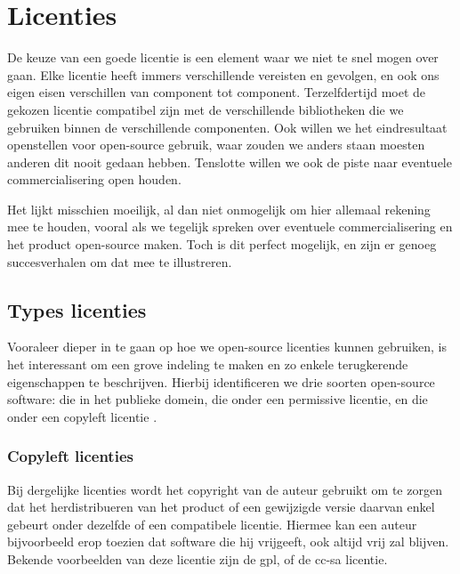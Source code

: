 \chapter{Licenties}
\label{ontwerp:licenties}

De keuze van een goede licentie is een element waar we niet te snel mogen over gaan. Elke licentie heeft immers verschillende vereisten en gevolgen, en ook ons eigen eisen verschillen van component tot component. Terzelfdertijd moet de gekozen licentie compatibel zijn met de verschillende bibliotheken die we gebruiken binnen de verschillende componenten. Ook willen we het eindresultaat openstellen voor open-source gebruik, waar zouden we anders staan moesten anderen dit nooit gedaan hebben. Tenslotte willen we ook de piste naar eventuele commercialisering open houden.

Het lijkt misschien moeilijk, al dan niet onmogelijk om hier allemaal rekening mee te houden, vooral als we tegelijk spreken over eventuele commercialisering en het product open-source maken. Toch is dit perfect mogelijk, en zijn er genoeg succesverhalen om dat mee te illustreren.

\section{Types licenties}
\label{ontwerp:licenties:type}

Vooraleer dieper in te gaan op hoe we open-source licenties kunnen gebruiken, is het interessant om een grove indeling te maken en zo enkele terugkerende eigenschappen te beschrijven. Hierbij identificeren we drie soorten open-source software: die in het publieke domein, die onder een permissive licentie, en die onder een copyleft licentie \citep{fsf:categories}.

\subsection{Copyleft licenties}
\label{ontwerp:licenties:type:copyleft}

Bij dergelijke licenties wordt het copyright van de auteur gebruikt om te zorgen dat het herdistribueren van het product of een gewijzigde versie daarvan enkel gebeurt onder dezelfde of een compatibele licentie. Hiermee kan een auteur bijvoorbeeld erop toezien dat software die hij vrijgeeft, ook altijd vrij zal blijven. Bekende voorbeelden van deze licentie zijn de \ac{gpl}, of de \ac{cc-sa} licentie.

